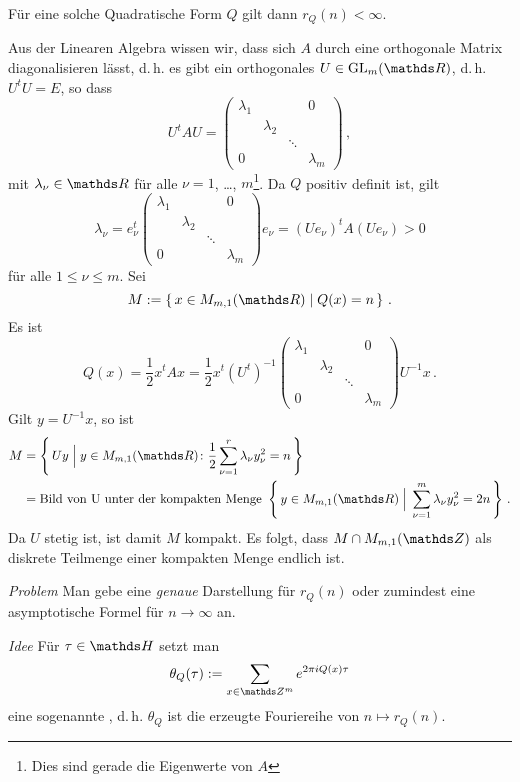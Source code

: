 \begin{lemm}
Für eine solche Quadratische Form $Q$ gilt dann $r_Q(n) < \infty$.
\end{lemm}

\begin{bewe}
Aus der Linearen Algebra wissen wir, dass sich $A$ durch eine orthogonale Matrix diagonalisieren lässt, d.\,h. es gibt ein orthogonales $U \in \GL_m(\RR)$, d.\,h. $U^tU = E$, so dass
\[
	U^tAU =
	\begin{pmatrix}
	\lambda_1 & & & 0 \\
	& \lambda_2 \\
	& & \ddots \\
	0 & & & \lambda_m
	\end{pmatrix}
	\,,
\]
mit $\lambda_\nu \in \RR$ für alle $\nu=1$, \ldots, $m$\footnote{Dies sind gerade die Eigenwerte von $A$}.
Da $Q$ positiv definit ist, gilt
\[
	\lambda_\nu = 
	e_\nu^t 	
			\begin{pmatrix}
			\lambda_1 & & & 0 \\
			& \lambda_2 \\
			& & \ddots \\
			0 & & & \lambda_m
			\end{pmatrix}
		e_\nu
	= (Ue_\nu)^tA(Ue_\nu)
	> 0
\]
für alle $1 \leq \nu \leq m$. Sei
\[
	M
	:= \Set{x\in M_{m,1}(\RR) \mid Q(x) = n}
	\,.
\]
Es ist
\[
	Q(x)
	= \frac{1}{2}x^tAx
	= \frac{1}{2} x^t(U ^t)^{-1}
			\begin{pmatrix}
			\lambda_1 & & & 0 \\
			& \lambda_2 \\
			& & \ddots \\
			0 & & & \lambda_m
			\end{pmatrix}
		U^{-1}x
		\,.
\]
Gilt $y = U^{-1} x$, so ist
\begin{align*}
	M &= \Set{Uy \;\Big|\; y \in M_{m,1}(\RR)\colon \frac{1}{2} \sum_{\nu=1}^r \lambda_\nu y_\nu^2 = n} \\
	&= \text{Bild von U unter der kompakten Menge } \Set{y \in M_{m,1}(\RR) \;\Big|\; \sum_{\nu=1}^m \lambda_\nu y_\nu^2 = 2n}
	\,.
\end{align*}
Da $U$ stetig ist, ist damit $M$ kompakt.
Es folgt, dass $M \cap M_{m,1}(\ZZ)$ als diskrete Teilmenge einer kompakten Menge endlich ist.
\end{bewe}

\emph{Problem} Man gebe eine \emph{genaue} Darstellung für $r_Q(n)$ oder zumindest eine asymptotische Formel für $n \to \infty$ an.

\emph{Idee} Für $\tau\in\HH$ setzt man
\[
	\theta_Q(\tau)
	:= \sum_{x\in\ZZ^m} e^{2\pi i Q(x) \tau}
\]
eine sogenannte , d.\,h. $\theta_Q$ ist die erzeugte Fouriereihe von $n \mapsto r_Q(n)$.

